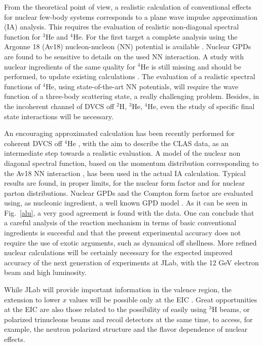 From the theoretical point of view, a realistic calculation 
of conventional effects for
nuclear few-body systems corresponds to a plane wave impulse approximation 
(IA) analysis. This requires the evaluation of realistic non-diagonal spectral
function for $^3$He and $^4$He.
For the first target a complete analysis using the Argonne 18 (Av18)
nucleon-nucleon (NN) potential is available
\cite{Scopetta:2004kj,Scopetta:2009sn,Rinaldi:2012pj,
Rinaldi:2012ft,Rinaldi:2014bba}.
Nuclear GPDs are found to be sensitive to details on 
the used NN interaction.
A study with nuclear ingredients of the same quality
for $^4$He is still missing and should be performed, to update 
existing calculations \cite{Guzey:2003jh,Liuti:2005gi}. 
The evaluation of a realistic spectral functions of $^4$He,
using state-of-the-art NN potentials,
will require the wave function of a three-body scattering state, 
a really challenging problem.
Besides, in the incoherent channel of DVCS off $^2$H, $^3$He, $^4$He,
even the study of specific final state interactions will be necessary.

An encouraging approximated calculation has been recently
performed for coherent DVCS off $^4$He \cite{PhysRevC.98.015203}, with the aim to
describe the CLAS data, as an intermediate
step towards a realistic evaluation.
A model of the nuclear non diagonal spectral function, 
based on the momentum distribution
corresponding to the Av18 NN interaction
\cite{PhysRevC.67.034003}, has been used in the 
actual IA
calculation. Typical results
are found, in proper limits, for the nuclear form factor
and for nuclear parton distributions.
Nuclear GPDs and the
Compton form factor are evaluated using, as nucleonic ingredient,
a well known GPD model \cite{Goloskokov:2011rd}. 
As it can be seen in Fig.~\ref{alu}, a very good agreement 
is found with the data.  
One can conclude that 
a careful analysis of the reaction mechanism in terms of
basic conventional ingredients is succesful and that
the present experimental accuracy does not require
the use of exotic arguments, such as dynamical off shellness.
More refined nuclear calculations will be certainly necessary for 
the expected improved accuracy of the next generation of experiments 
at JLab, with the 12 GeV electron beam and high luminosity. 
  
While JLab will provide important information
in the valence region, the extension to lower
$x$ values will be possible only at the EIC \cite{Accardi:2012qut}. 
Great opportunities at the EIC are also those related to the possibility
of easily using $^3$H beams, or polarized trinucleons beams and 
recoil detectors at the same time, to access, for example, 
the neutron polarized structure and the flavor dependence 
of nuclear effects.





